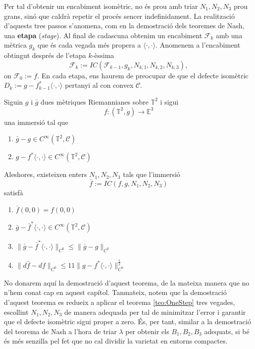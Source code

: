 Per tal d'obtenir un encabiment isomètric, no és prou amb triar $N_1, N_2, N_3$ prou grans, sinó que caldrà repetir el procés sencer indefinidament. La realització d'aquests tres passos s'anomena, com en la demostració dels teoremes de Nash, una \textbf{etapa} (\textit{stage}). Al final de cadascuna obtenim un encabiment $\mathcal F_k$ amb una mètrica $g_k$ que és cada vegada més propera a $\langle\cdot, \cdot\rangle$. Anomenem a l'encabiment obtingut després de l'etapa $k$-èssima 
\begin{equation*}
    \mathcal F_k:=IC(\mathcal F_{k-1}, g_k, N_{k,1}, N_{k,2}, N_{k,3}),
\end{equation*}
on $\mathcal F_0:=f$. En cada etapa, ens haurem de preocupar de que el defecte isomètric $D_k:=g-f_{k-1}^*\langle\cdot, \cdot\rangle$ pertanyi al con convex $\mathcal C$.

\begin{teo}\label{teo:Stage}
    Siguin $g$ i $\bar g$ dues mètriques Riemannianes sobre $\mathbb T^2$ i sigui 
    \begin{equation*}
        f:(\mathbb T^2, g)\to\mathbb E^3
    \end{equation*}
    una immersió tal que
    \begin{enumerate}
        \item $\bar g - g\in C^\infty(\mathbb T^2, \mathcal C)$
        \item $g-f^*\langle\cdot, \cdot\rangle\in C^\infty(\mathbb T^2, \mathcal C)$
    \end{enumerate}
    Aleshores, existeixen enters $N_1, N_2, N_3$ tals que l'immersió
    \begin{equation*}
        \bar f:=IC(f, g, N_1, N_2, N_3)
    \end{equation*}
    satisfà
    \begin{enumerate}
        \item $\bar f(0,0) = f(0,0)$
        \item $\bar g - \bar f^*\langle\cdot, \cdot\rangle\in C^\infty(\mathbb T^2, \mathcal C)$
        \item $\|\bar g - \bar f^*\langle\cdot, \cdot\rangle\|_{C^0}\le \|\bar g - g\|_{C^0}$
        \item $\|d\bar f - df\|_{C^0}\le11\|g-f^*\langle\cdot, \cdot\rangle\|_{C^0}^{\frac{1}{2}}$
    \end{enumerate}
\end{teo}

\begin{obs}
    No donarem aquí la demostració d'aquest teorema, de la mateixa manera que no n'hem conat cap en aquest capítol. Tanmateix, notem que la demostració d'aquest teorema es redueix a aplicar el teorema \ref{teo:OneStep} tres vegades, escollint $N_1, N_2, N_3$ de manera adequada per tal de minimitzar l'error i garantir que el defecte isomètric sigui proper a zero. És, per tant, similar a la demostració del teorema de Nash a l'hora de triar $\lambda$ per obtenir els $B_1, B_2, B_3$ adequats, si bé és més senzilla pel fet que no cal dividir la varietat en entorns compactes.
\end{obs}

